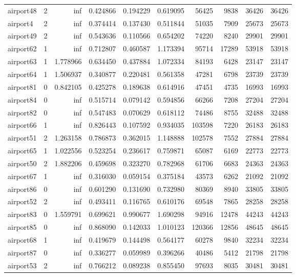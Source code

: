 \begin{longtable}{|l|r|r|r|r|r|r|r|r|r|}
airport48 & 2 & inf & 0.424866 & 0.194229 & 0.619095 & 56425 & 9838 & 36426 & 36426 \\
airport4 & 2 & inf & 0.374414 & 0.137430 & 0.511844 & 51035 & 7909 & 25673 & 25673 \\
airport49 & 2 & inf & 0.543636 & 0.110566 & 0.654202 & 74220 & 8240 & 29901 & 29901 \\
airport62 & 1 & inf & 0.712807 & 0.460587 & 1.173394 & 95714 & 17289 & 53918 & 53918 \\
airport63 & 1 & 1.778966 & 0.634450 & 0.437884 & 1.072334 & 84193 & 6428 & 23147 & 23147 \\
airport64 & 1 & 1.506937 & 0.340877 & 0.220481 & 0.561358 & 47281 & 6798 & 23739 & 23739 \\
airport81 & 0 & 0.842105 & 0.425278 & 0.189638 & 0.614916 & 47451 & 4735 & 16993 & 16993 \\
airport84 & 0 & inf & 0.515714 & 0.079142 & 0.594856 & 66266 & 7208 & 27204 & 27204 \\
airport82 & 0 & inf & 0.547483 & 0.070629 & 0.618112 & 74486 & 8755 & 32488 & 32488 \\
airport66 & 1 & inf & 0.826443 & 0.107592 & 0.934035 & 103598 & 7220 & 26183 & 26183 \\
airport51 & 2 & 1.263158 & 0.786873 & 0.362015 & 1.148888 & 102578 & 7552 & 27884 & 27884 \\
airport65 & 1 & 1.022556 & 0.523254 & 0.236617 & 0.759871 & 65087 & 6169 & 22773 & 22773 \\
airport50 & 2 & 1.882206 & 0.459698 & 0.323270 & 0.782968 & 61706 & 6683 & 24363 & 24363 \\
airport67 & 1 & inf & 0.316030 & 0.059154 & 0.375184 & 43573 & 6262 & 21092 & 21092 \\
airport86 & 0 & inf & 0.601290 & 0.131690 & 0.732980 & 80369 & 8940 & 33805 & 33805 \\
airport52 & 2 & inf & 0.493411 & 0.116765 & 0.610176 & 69548 & 7865 & 28258 & 28258 \\
airport83 & 0 & 1.559791 & 0.699621 & 0.990677 & 1.690298 & 94916 & 12478 & 44243 & 44243 \\
airport85 & 0 & inf & 0.868090 & 0.142033 & 1.010123 & 120366 & 12856 & 48645 & 48645 \\
airport68 & 1 & inf & 0.419679 & 0.144498 & 0.564177 & 60278 & 9840 & 32234 & 32234 \\
airport87 & 0 & inf & 0.336277 & 0.059989 & 0.396266 & 40486 & 5412 & 21798 & 21798 \\
airport53 & 2 & inf & 0.766212 & 0.089238 & 0.855450 & 97693 & 8035 & 30481 & 30481 \\

\end{longtable}

